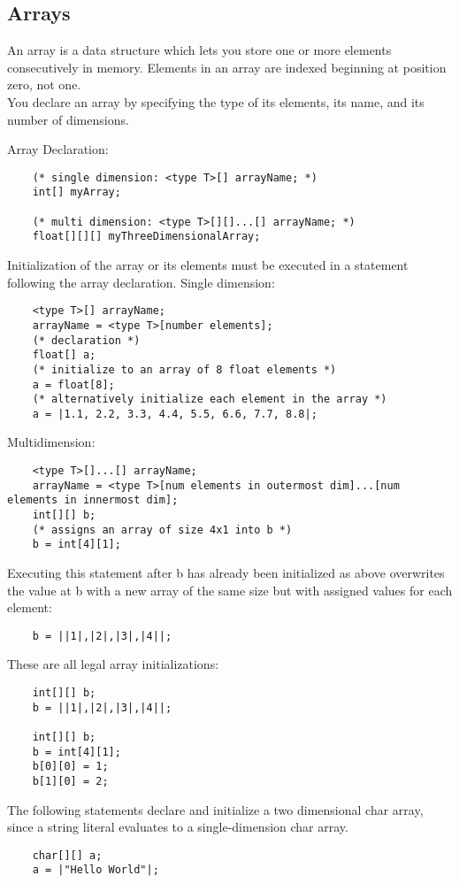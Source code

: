 \begin{homeworkProblem}
	\subsection{Arrays}
	An array is a data structure which lets you store one or more elements consecutively in memory. Elements in an array are indexed beginning at position zero, not one.\\

	You declare an array by specifying the type of its elements, its name, and its number of dimensions.	
	
	Array Declaration:
	\begin{verbatim}
	(* single dimension: <type T>[] arrayName; *)
	int[] myArray;

	(* multi dimension: <type T>[][]...[] arrayName; *)
	float[][][] myThreeDimensionalArray;
	\end{verbatim}
	
	Initialization of the array or its elements must be executed in a statement following the array declaration.
	Single dimension:
	\begin{verbatim}
	<type T>[] arrayName;
	arrayName = <type T>[number elements];
	(* declaration *)
	float[] a;
	(* initialize to an array of 8 float elements *)
	a = float[8];
	(* alternatively initialize each element in the array *)
	a = |1.1, 2.2, 3.3, 4.4, 5.5, 6.6, 7.7, 8.8|;
	\end{verbatim}

	Multidimension:
	\begin{verbatim}
	<type T>[]...[] arrayName;
	arrayName = <type T>[num elements in outermost dim]...[num elements in innermost dim];
	int[][] b;
	(* assigns an array of size 4x1 into b *)
	b = int[4][1];
	\end{verbatim}

	Executing this statement after b has already been initialized as above overwrites the value at b with a new array of the same size but with assigned values for each element:
	\begin{verbatim}
	b = ||1|,|2|,|3|,|4||;
	\end{verbatim}

	These are all legal array initializations:
	\begin{verbatim}
	int[][] b;
	b = ||1|,|2|,|3|,|4||;

	int[][] b;
	b = int[4][1];
	b[0][0] = 1;
	b[1][0] = 2;
	\end{verbatim}

	The following statements declare and initialize a two dimensional char array, since a string literal evaluates to a single-dimension char array.
	\begin{verbatim}
	char[][] a;
	a = |"Hello World"|;
	\end{verbatim}


\end{homeworkProblem}
